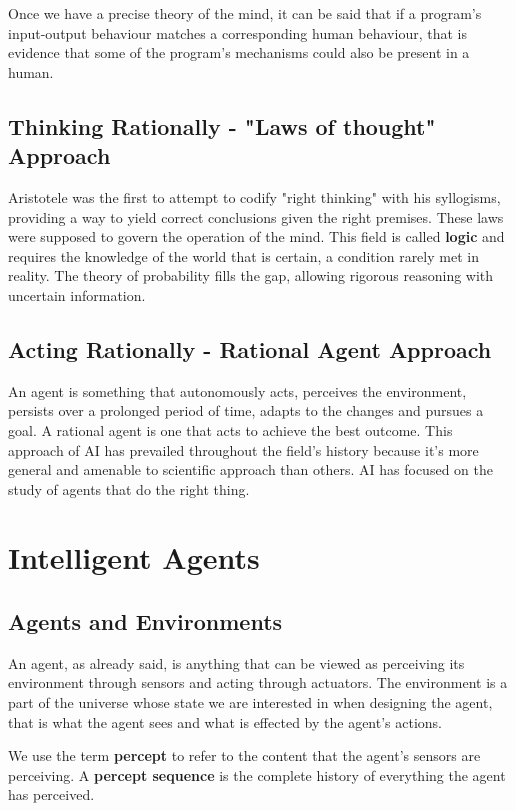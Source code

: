 \documentclass{article}
\begin{document}
Once we have a precise theory of the mind, it can be said that if a program's input-output behaviour matches a corresponding human behaviour, that is evidence that some of the program's mechanisms could also be present in a human.

\subsection{Thinking Rationally - "Laws of thought" Approach}
Aristotele was the first to attempt to codify "right thinking" with his syllogisms, providing a way to yield correct conclusions given the right premises. These laws were supposed to govern the operation of the mind. This field is called \textbf{logic} and requires the knowledge of the world that is certain,  a condition rarely met in reality. The theory of probability fills the gap, allowing rigorous reasoning with uncertain information.

\subsection{Acting Rationally - Rational Agent Approach}
An agent is something that autonomously acts, perceives the environment, persists over a prolonged period of time, adapts to the changes and pursues a goal. A rational agent is one that acts to achieve the best outcome.
This approach of AI has prevailed throughout the field's history because it's more general and amenable to scientific approach than others. AI has focused on the study of agents that do the right thing.

\newpage
\section{Intelligent Agents}
\subsection{Agents and Environments}
An agent, as already said, is anything that can be viewed as perceiving its environment through sensors and acting through actuators. The environment is a part of the universe whose state we are interested in when designing the agent, that is what the agent sees and what is effected by the agent's actions.

We use the term \textbf{percept} to refer to the content that the agent's sensors are perceiving. A \textbf{percept sequence} is the complete history of everything the agent has perceived.
\end{document}
